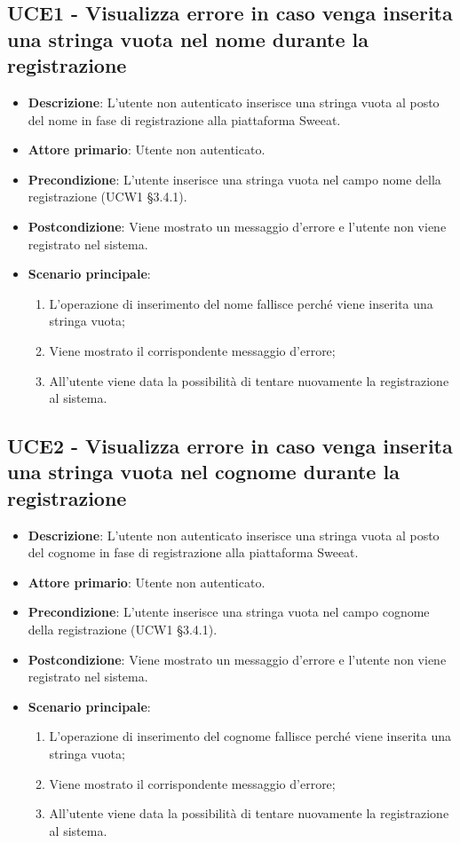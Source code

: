 \subsection{UCE1 - Visualizza errore in caso venga inserita una stringa vuota nel nome durante la registrazione}
\begin{itemize}
\item \textbf{Descrizione}: L'utente non autenticato inserisce una stringa vuota al posto del nome in fase di registrazione alla piattaforma Sweeat.
\item \textbf{Attore primario}: Utente non autenticato.
\item \textbf{Precondizione}: L'utente inserisce una stringa vuota nel campo nome della registrazione (UCW1 §3.4.1).
\item \textbf{Postcondizione}: Viene mostrato un messaggio d'errore e l'utente non viene registrato nel sistema.

\item \textbf{Scenario principale}:
\begin{enumerate}
\item L'operazione di inserimento del nome fallisce perché viene inserita una stringa vuota;
\item Viene mostrato il corrispondente messaggio d'errore;
\item All'utente viene data la possibilità di tentare nuovamente la registrazione al sistema.
\end{enumerate}
\end{itemize}

\subsection{UCE2 - Visualizza errore in caso venga inserita una stringa vuota nel cognome durante la registrazione}
\begin{itemize}
\item \textbf{Descrizione}: L'utente non autenticato inserisce una stringa vuota al posto del cognome in fase di registrazione alla piattaforma Sweeat.
\item \textbf{Attore primario}: Utente non autenticato.
\item \textbf{Precondizione}: L'utente inserisce una stringa vuota nel campo cognome della registrazione (UCW1 §3.4.1).
\item \textbf{Postcondizione}: Viene mostrato un messaggio d'errore e l'utente non viene registrato nel sistema.

\item \textbf{Scenario principale}:
\begin{enumerate}
\item L'operazione di inserimento del cognome fallisce perché viene inserita una stringa vuota;
\item Viene mostrato il corrispondente messaggio d'errore;
\item All'utente viene data la possibilità di tentare nuovamente la registrazione al sistema.
\end{enumerate}
\end{itemize}

